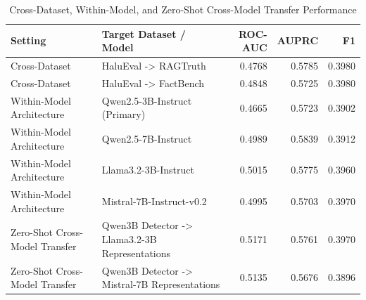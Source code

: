 \begin{table}[htbp]
\caption{Cross-Dataset, Within-Model, and Zero-Shot Cross-Model Transfer Performance}
\begin{center}
\begin{tabular}{llrrr}
\toprule
\textbf{Setting} & \textbf{Target Dataset / Model} & \textbf{ROC-AUC} & \textbf{AUPRC} & \textbf{F1} \\
\midrule
Cross-Dataset & HaluEval -> RAGTruth & 0.4768 & 0.5785 & 0.3980 \\
Cross-Dataset & HaluEval -> FactBench & 0.4848 & 0.5725 & 0.3980 \\
Within-Model Architecture & Qwen2.5-3B-Instruct (Primary) & 0.4665 & 0.5723 & 0.3902 \\
Within-Model Architecture & Qwen2.5-7B-Instruct & 0.4989 & 0.5839 & 0.3912 \\
Within-Model Architecture & Llama3.2-3B-Instruct & 0.5015 & 0.5775 & 0.3960 \\
Within-Model Architecture & Mistral-7B-Instruct-v0.2 & 0.4995 & 0.5703 & 0.3970 \\
Zero-Shot Cross-Model Transfer & Qwen3B Detector -> Llama3.2-3B Representations & 0.5171 & 0.5761 & 0.3970 \\
Zero-Shot Cross-Model Transfer & Qwen3B Detector -> Mistral-7B Representations & 0.5135 & 0.5676 & 0.3896 \\
\bottomrule
\end{tabular}
\label{tab:generalization}
\end{center}
\end{table}